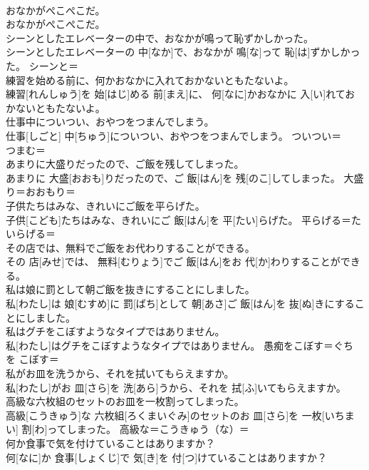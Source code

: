 \documentclass[8pt]{extreport}
\begin{document}
\begin{CJK}{UTF8}{min}
\\	おなかがぺこぺこだ。	
\\	おなかがぺこぺこだ。	
\\	シーンとしたエレベーターの中で、おなかが鳴って恥ずかしかった。	
\\	シーンとしたエレベーターの 中[なか]で、おなかが 鳴[な]って 恥[は]ずかしかった。	シーンと＝ 
\\	練習を始める前に、何かおなかに入れておかないともたないよ。	
\\	練習[れんしゅう]を 始[はじ]める 前[まえ]に、 何[なに]かおなかに 入[い]れておかないともたないよ。	
\\	仕事中についつい、おやつをつまんでしまう。	
\\	仕事[しごと] 中[ちゅう]についつい、おやつをつまんでしまう。	ついつい＝ 
\\	つまむ＝ 
\\	あまりに大盛りだったので、ご飯を残してしまった。	
\\	あまりに 大盛[おおも]りだったので、ご 飯[はん]を 残[のこ]してしまった。	大盛り＝おおもり＝ 
\\	子供たちはみな、きれいにご飯を平らげた。	
\\	子供[こども]たちはみな、きれいにご 飯[はん]を 平[たい]らげた。	平らげる＝たいらげる＝ 
\\	その店では、無料でご飯をお代わりすることができる。	
\\	その 店[みせ]では、 無料[むりょう]でご 飯[はん]をお 代[か]わりすることができる。	
\\	私は娘に罰として朝ご飯を抜きにすることにしました。	
\\	私[わたし]は 娘[むすめ]に 罰[ばち]として 朝[あさ]ご 飯[はん]を 抜[ぬ]きにすることにしました。	
\\	私はグチをこぼすようなタイプではありません。	
\\	私[わたし]はグチをこぼすようなタイプではありません。	愚痴をこぼす＝ぐち を こぼす＝ 
\\	私がお皿を洗うから、それを拭いてもらえますか。	
\\	私[わたし]がお 皿[さら]を 洗[あら]うから、それを 拭[ふ]いてもらえますか。	
\\	高級な六枚組のセットのお皿を一枚割ってしまった。	
\\	高級[こうきゅう]な 六枚組[ろくまいぐみ]のセットのお 皿[さら]を 一枚[いちまい] 割[わ]ってしまった。	高級な＝こうきゅう（な）＝ 
\\	何か食事で気を付けていることはありますか？	
\\	何[なに]か 食事[しょくじ]で 気[き]を 付[つ]けていることはありますか？	

\end{CJK}
\end{document}
